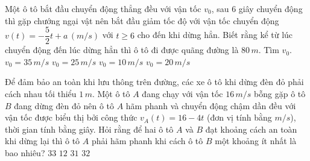 \begin{ex}%
    Một ô tô bắt đầu chuyển động thẳng đều với vận tốc $v_0$, sau $6$ giây chuyển động thì gặp chướng ngại vật nên bắt đầu giảm tốc độ với vận tốc chuyển động $v(t)=-\dfrac{5}{2}t+a\,(m/s)$ với $t\ge 6$ cho đến khi dừng hẳn. Biết rằng kể từ lúc chuyển động đến lúc dừng hẳn thì ô tô đi được quãng đường là $80\,m$. Tìm $v_0$.
    \choice
    {$v_0=35\,m/s$}
    {$v_0=25\,m/s$}
    {\True $v_0=10\,m/s$}
    {$v_0=20\,m/s$}
\end{ex}

\begin{ex}%
    Để đảm bảo an toàn khi lưu thông trên đường, các xe ô tô khi dừng đèn đỏ phải cách nhau tối thiểu $1\,m$. Một ô tô $A$ đang chạy với vận tốc $16\,m/s$ bỗng gặp ô tô $B$ đang dừng đèn đỏ nên ô tô $A$ hãm phanh và chuyển động chậm dần đều với vận tốc được biểu thị bởi công thức $v_A\left(t \right)=16-4t$ (đơn vị tính bằng $m/s$), thời gian tính bằng giây. Hỏi rằng để hai ô tô $A$ và $B$ đạt khoảng cách an toàn khi dừng lại thì ô tô $A$ phải hãm phanh khi cách ô tô $B$ một khoảng ít nhất là bao nhiêu?
    \choice
    {$33$}
    {$12$}
    {$31$}
    {\True $32$}
\end{ex}

